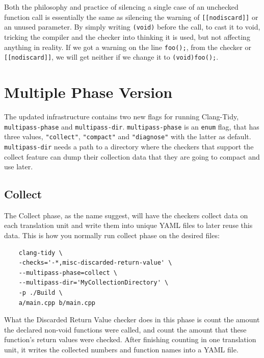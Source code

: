 Both the philosophy and practice of silencing a single case of an unchecked function call is essentially the same as silencing the
warning of \texttt{[[nodiscard]]} or an unused parameter. By simply writing \texttt{(void)} before the call, to cast it to void,
tricking the compiler and the checker into thinking it is used, but not affecting anything in reality.
If we got a warning on the line \texttt{foo();}, from the checker or \texttt{[[nodiscard]]}, we will get neither if we change it
to \texttt{(void)foo();}.

\section{Multiple Phase Version}

The updated infrastructure contains two new flags for running Clang-Tidy, \texttt{multipass-phase} and \texttt{multipass-dir}.
\texttt{multipass-phase} is an \texttt{enum} flag, that has three values, \texttt{"collect"}, \texttt{"compact"} and \texttt{"diagnose"}
with the latter as default.
\texttt{multipass-dir} needs a path to a directory where the checkers that support the collect feature can dump their collection data
that they are going to compact and use later.


\subsection{Collect}

The Collect phase, as the name suggest, will have the checkers collect data on each translation unit and write them into unique YAML
files to later reuse this data. This is how you normally run collect phase on the desired files:

\begin{listing}[H]
	\begin{verbatim}
	clang-tidy \
	-checks='-*,misc-discarded-return-value' \
	--multipass-phase=collect \
	--multipass-dir='MyCollectionDirectory' \
	-p ./Build \
	a/main.cpp b/main.cpp
	\end{verbatim}
\end{listing}

What the Discarded Return Value checker does in this phase is count the amount the declared non-void functions were called,
and count the amount that these function's return values were checked. After finishing counting in one translation unit, it writes the
collected numbers and function names into a YAML file.


